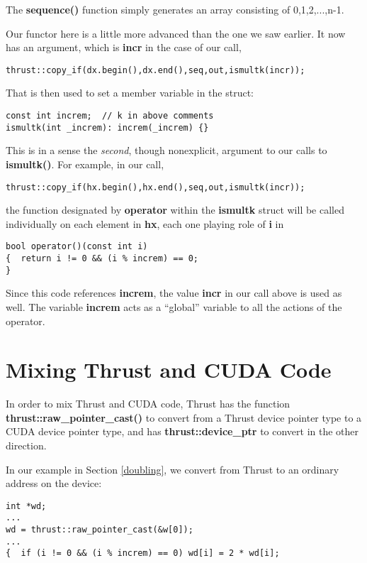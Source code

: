 The {\bf sequence()} function simply generates an array consisting of 
0,1,2,...,n-1.

Our functor here is a little more advanced than the one we saw earlier.
It now has an argument, which is {\bf incr} in the case of our call,

\begin{lstlisting}
thrust::copy_if(dx.begin(),dx.end(),seq,out,ismultk(incr));
\end{lstlisting}

That is then used to set a member variable in the struct:

\begin{lstlisting}
const int increm;  // k in above comments
ismultk(int _increm): increm(_increm) {}
\end{lstlisting}

This is in a sense the {\it second}, though nonexplicit, argument to our
calls to {\bf ismultk()}.  For example, in our call,

\begin{lstlisting}
thrust::copy_if(hx.begin(),hx.end(),seq,out,ismultk(incr));
\end{lstlisting}

the function designated by {\bf operator} within the {\bf ismultk}
struct will be called individually on each element in {\bf hx}, each one
playing role of {\bf i} in

\begin{lstlisting}
bool operator()(const int i)
{  return i != 0 && (i % increm) == 0;
}
\end{lstlisting}

Since this code references {\bf increm}, the value {\bf incr} in our
call above is used as well.  The variable {\bf increm} acts as a
``global'' variable to all the actions of the operator.

\section{Mixing Thrust and CUDA Code}

In order to mix Thrust and CUDA code, Thrust has the function {\bf
thrust::raw\_pointer\_cast()} to convert from a Thrust device pointer
type to a CUDA device pointer type, and has {\bf thrust::device\_ptr} to
convert in the other direction.  

In our example in Section \ref{doubling}, we convert from Thrust to
an ordinary address on the device:

\begin{lstlisting}
int *wd;
...
wd = thrust::raw_pointer_cast(&w[0]);
...
{  if (i != 0 && (i % increm) == 0) wd[i] = 2 * wd[i];
\end{lstlisting}

